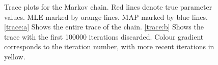 \documentclass{ieeeaccess}
\theoremstyle{definition}
\begin{document}
\begin{figure}[H]
  \centering

  \caption{Trace plots for the Markov chain. Red lines denote true parameter values. MLE marked by orange lines. MAP marked by blue lines. \ref{trace:a} Shows the entire trace of the chain. \ref{trace:b} Shows the trace with the first 100000 iterations discarded. Colour gradient corresponds to the iteration number, with more recent iterations in yellow.}
  \label{fig:trace}
\end{figure}
\end{document}
